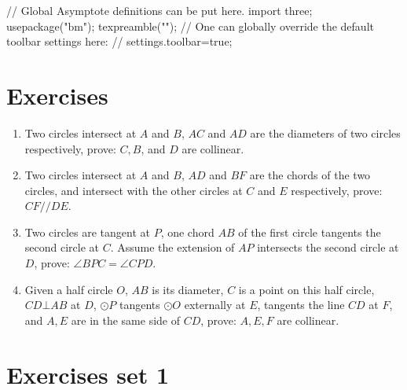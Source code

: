 \documentclass[12pt]{article}
\begin{document}
\def\asylatexdir{}
\def\asydir{}

\begin{asydef}
// Global Asymptote definitions can be put here.
import three;
usepackage("bm");
texpreamble("\def\V#1{\bm{#1}}");
// One can globally override the default toolbar settings here:
// settings.toolbar=true;
\end{asydef}



\section*{Exercises}

\begin{enumerate}

\item Two circles intersect at $A$ and $B$, $AC$ and $AD$ are the diameters of two circles respectively, prove: $C, B$, and  $D$ are collinear.
 
\item Two circles  intersect at $A$ and $B$, $AD$ and $BF$ are the chords of the two circles, and   intersect with the other circles at $C$ and $E$ respectively, prove: $CF//DE$.

\item Two circles are tangent at $P$, one chord $AB$ of the first circle tangents the second circle at $C$. Assume the extension of $AP$ intersects the second circle at $D$, prove: $\angle BPC=\angle CPD$.

\item Given a half circle $O$, $AB$ is its diameter, $C$ is a point on this half circle, $CD\bot AB$ at $D$, $\odot P$ tangents $\odot O$ externally at $E$, tangents the line $CD$ at $F$, and $A, E$ are in the
same side of $CD$, prove: $A, E, F$ are collinear.

\end{enumerate} 

\section*{Exercises set 1}
\end{document}
